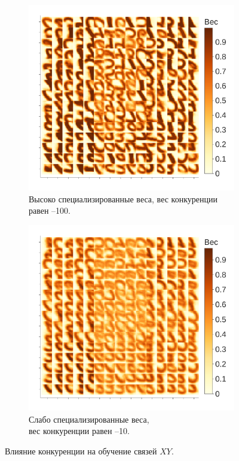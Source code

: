 \documentclass[a4paper]{article}
\begin{document}
\begin{figure}
\centering
\begin{subfigure}{0.45\textwidth}
    \includegraphics[width=\textwidth,keepaspectratio=true]{weights_XY_good_ru.pdf}
    \caption{Высоко специализированные веса, вес конкуренции равен --100.}
    \label{fig:high_comp}
\end{subfigure}
\begin{subfigure}{0.45\textwidth}
    \includegraphics[width=\textwidth,keepaspectratio=true]{weights_XY_bad_ru.pdf}
    \caption{Слабо специализированные веса,\\ вес конкуренции равен --10.}
    \label{fig:low_comp}
\end{subfigure}
\caption{Влияние конкуренции на обучение связей $XY$.}
\label{competition-training-importance}
\end{figure}
\end{document}
